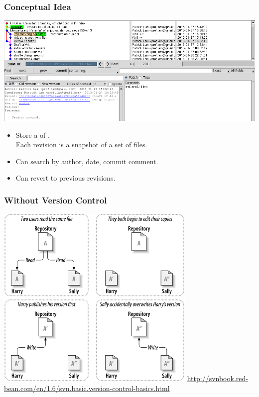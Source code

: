 \begin{frame}
\frametitle{Conceptual Idea}

\begin{center}
\includegraphics[width=.7\textwidth]{images/git}
\end{center}

\begin{changemargin}{1cm}
\begin{itemize}
\item Store a  of .\\[1em]
Each revision is a snapshot of a set of files.
\item Can search by author, date, commit comment.
\item Can revert to previous revisions.
\end{itemize}
\end{changemargin}
\end{frame}


\begin{frame}
\frametitle{Without Version Control}
\begin{changemargin}{1cm}

\begin{center}
	\includegraphics[width=.65\textwidth]{images/ch02dia2.png}
	\hfill {\tiny \url{http://svnbook.red-bean.com/en/1.6/svn.basic.version-control-basics.html}} 
\end{center}


\end{changemargin}
\end{frame}

